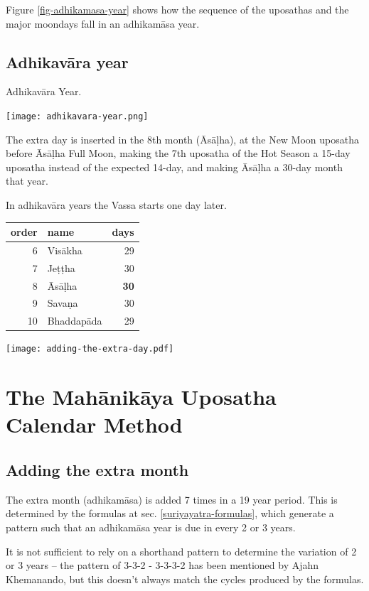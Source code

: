 \documentclass[11pt,oneside]{memoir-article}
\begin{document}
Figure \ref{fig-adhikamasa-year} shows how the sequence of the uposathas and the
major moondays fall in an adhikamāsa year.

\section{Adhikavāra year}
\label{sec-1-4}

\begin{marginfigure}
\caption{\label{fig-adhikavara-year} Adhikavāra Year.}
\texttt{[image: adhikavara-year.png]}
\end{marginfigure}

The extra day is inserted in the 8th month (Āsāḷha), at the New Moon uposatha
before Āsāḷha Full Moon, making the 7th uposatha of the Hot Season a 15-day
uposatha instead of the expected 14-day, and making Āsāḷha a 30-day month that
year.\autocite{hasapannyo-zodiac}

In adhikavāra years the Vassa starts one day later.

\begin{center}
\begin{tabular}{rlr}
order & name & days\\
\hline
6 & Visākha & 29\\
7 & Jeṭṭha & 30\\
8 & Āsāḷha & \textbf{30}\\
9 & Savaṇa & 30\\
10 & Bhaddapāda & 29\\
\end{tabular}
\end{center}

\texttt{[image: adding-the-extra-day.pdf]}

\clearpage

\chapter{The Mahānikāya Uposatha Calendar Method}
\label{sec-2}
\section{Adding the extra month}
\label{sec-2-1}

The extra month (adhikamāsa) is added 7 times in a 19 year period. This is
determined by the formulas at sec. \ref{suriyayatra-formulas}, which generate a pattern
such that an adhikamāsa year is due in every 2 or 3 years.

It is not sufficient to rely on a shorthand pattern to determine the variation
of 2 or 3 years -- the pattern of 3-3-2 - 3-3-3-2 has been mentioned by Ajahn
Khemanando\autocite{khemanando-adhikamasa}, but this doesn't always match the cycles
produced by the formulas.
\end{document}
